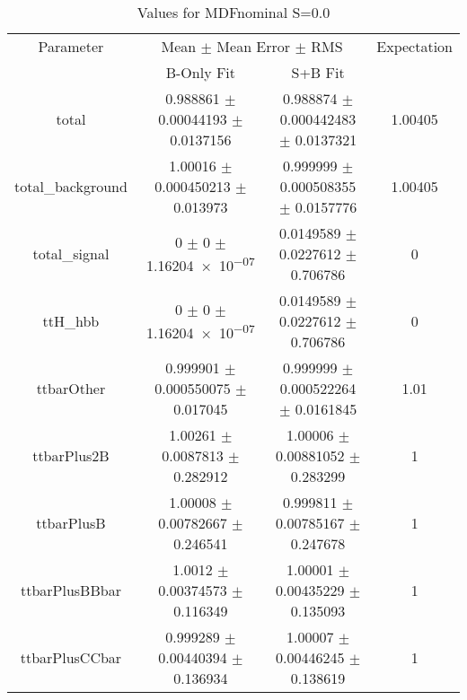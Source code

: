 \begin{table}
\centering
\caption{Values for MDFnominal S=0.0}
\begin{tabular}{cccc}
\toprule
Parameter & \multicolumn{2}{c}{Mean $\pm$ Mean Error $\pm$ RMS} & Expectation\\
 & B-Only Fit & S+B Fit & \\
\midrule
total & \num{0.988861} $\pm$ \num{0.00044193} $\pm$ \num{0.0137156} & \num{0.988874} $\pm$ \num{0.000442483} $\pm$ \num{0.0137321} & \num{1.00405}\\
total\_background & \num{1.00016} $\pm$ \num{0.000450213} $\pm$ \num{0.013973} & \num{0.999999} $\pm$ \num{0.000508355} $\pm$ \num{0.0157776} & \num{1.00405}\\
total\_signal & \num{0} $\pm$ \num{0} $\pm$ \num{1.16204e-07} & \num{0.0149589} $\pm$ \num{0.0227612} $\pm$ \num{0.706786} & \num{0}\\
ttH\_hbb & \num{0} $\pm$ \num{0} $\pm$ \num{1.16204e-07} & \num{0.0149589} $\pm$ \num{0.0227612} $\pm$ \num{0.706786} & \num{0}\\
ttbarOther & \num{0.999901} $\pm$ \num{0.000550075} $\pm$ \num{0.017045} & \num{0.999999} $\pm$ \num{0.000522264} $\pm$ \num{0.0161845} & \num{1.01}\\
ttbarPlus2B & \num{1.00261} $\pm$ \num{0.0087813} $\pm$ \num{0.282912} & \num{1.00006} $\pm$ \num{0.00881052} $\pm$ \num{0.283299} & \num{1}\\
ttbarPlusB & \num{1.00008} $\pm$ \num{0.00782667} $\pm$ \num{0.246541} & \num{0.999811} $\pm$ \num{0.00785167} $\pm$ \num{0.247678} & \num{1}\\
ttbarPlusBBbar & \num{1.0012} $\pm$ \num{0.00374573} $\pm$ \num{0.116349} & \num{1.00001} $\pm$ \num{0.00435229} $\pm$ \num{0.135093} & \num{1}\\
ttbarPlusCCbar & \num{0.999289} $\pm$ \num{0.00440394} $\pm$ \num{0.136934} & \num{1.00007} $\pm$ \num{0.00446245} $\pm$ \num{0.138619} & \num{1}\\
\bottomrule
\end{tabular}
\end{table}